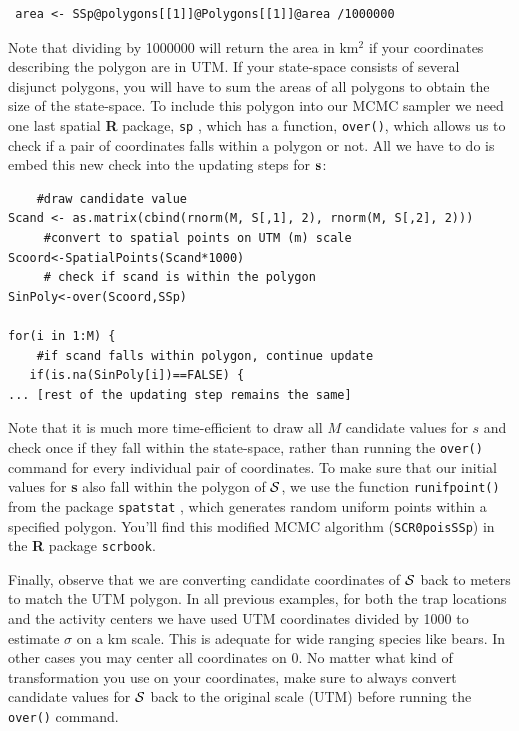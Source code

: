 \begin{verbatim}
 area <- SSp@polygons[[1]]@Polygons[[1]]@area /1000000
\end{verbatim}

 Note that dividing by 1000000 will return the area in km$^2$ if your coordinates describing the polygon are in UTM. If your state-space consists of several disjunct polygons, you will have to sum the areas of all polygons to obtain the size of the state-space.
To include this polygon into our MCMC sampler we need one last spatial 
{\bf R} package, \mbox{\tt sp} \citep{pebesma_bivand:2011}, which has a 
function, \verb#over()#, which allows us to check if a pair of coordinates 
falls within a polygon or not. All we have to do is embed this new check 
into the updating steps for ${\bf s}$:
\begin{verbatim}
    #draw candidate value
Scand <- as.matrix(cbind(rnorm(M, S[,1], 2), rnorm(M, S[,2], 2)))
     #convert to spatial points on UTM (m) scale
Scoord<-SpatialPoints(Scand*1000)   
     # check if scand is within the polygon
SinPoly<-over(Scoord,SSp)		

for(i in 1:M) {
    #if scand falls within polygon, continue update
   if(is.na(SinPoly[i])==FALSE) {		
... [rest of the updating step remains the same]
\end{verbatim}
Note that it is much more time-efficient to draw all $M$ candidate values 
for $s$ and check once if they fall within the state-space, rather than 
running the \verb#over()# command for every individual pair of 
coordinates. To make sure that our initial values for {\bf s} also fall 
within the polygon of ${\cal S}$, we use the function \verb#runifpoint()# 
from the package \mbox{\tt spatstat} \citep{baddeley_turner:2005}, 
which generates random uniform points within a specified polygon. You'll 
find this modified MCMC algorithm (\mbox{\tt SCR0poisSSp}) in the {\bf R} 
package \mbox{\tt scrbook}.

Finally, observe that we are converting candidate coordinates of ${\cal S}$ 
back to meters to match the UTM polygon. In all previous examples, 
for both the trap locations and the activity centers we have used UTM 
coordinates divided by 1000 to estimate $\sigma$ on a km scale. This is 
adequate for wide ranging species like bears. In other cases you 
may center all coordinates on 0. No matter what kind of transformation you 
use on your coordinates, make sure to always convert candidate values for 
${\cal S}$ back to the original scale (UTM) before running the 
\verb#over()# command.

